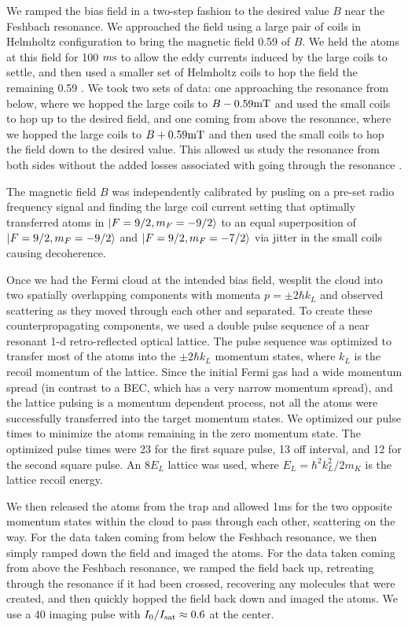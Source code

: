 \documentclass[12pt]{iopart}
\begin{document}
\par We ramped the bias field in a two-step fashion to the desired value $B$ near the Feshbach resonance. We approached the field using a large pair of  coils in Helmholtz configuration to bring the magnetic field 0.59 \mT{} of $B$. We held the atoms at this field for 100 $m\rm{s}$ to allow the eddy currents induced by the large coils to settle, and then used a smaller set of Helmholtz coils to hop the field the remaining 0.59 \mT{}. We took two sets of data: one approaching the resonance from below, where we hopped the large coils to $B-0.59 \mT{}$ and used the small coils to hop up to the desired field, and one coming from above the resonance, where we hopped the large coils to  $B+0.59  \mT{}$ and then used the small coils to hop the field down to the desired value. This allowed us study the resonance from both sides without the added losses associated with going through the resonance \cite{Chin10}.
\par The magnetic field $B$ was independently calibrated by pusling on a pre-set radio frequency signal and finding the large coil current setting that optimally transferred \K{} atoms in $\mathinner{|{F=9/2,m_F=-9/2}\rangle}$ to an equal superposition of $\mathinner{|{F=9/2,m_F=-9/2}\rangle}$ and $\mathinner{|{F=9/2,m_F=-7/2}\rangle}$ via jitter in the small coils causing decoherence.
\par Once we had the Fermi cloud at the intended bias field, wesplit the cloud into two spatially overlapping components with momenta $p=\pm 2\hbar k_L$  and observed scattering as they moved through each other and separated. To create these counterpropagating components, we used a double pulse sequence \cite{Wu05} of a near resonant 1-d retro-reflected optical lattice. The pulse sequence was optimized to transfer most of the atoms into the $\pm 2 \hbar k_L$ momentum states, where $k_L$ is the recoil momentum of the lattice. Since the initial Fermi gas had a wide momentum spread (in contrast to a BEC, which has a very narrow momentum spread), and the lattice pulsing is a momentum dependent process, not all the atoms were successfully transferred into the target momentum states. We optimized our pulse times to minimize the atoms remaining in the zero momentum state. The optimized pulse times were 23 \us{} for the first square pulse, 13 \us{} off interval, and 12 \us{} for the second square pulse. An 8$E_L$ lattice was used, where $E_L=\hbar^2 k_L^2/2m_K$ is the lattice recoil energy.  
\par We then released the atoms from the trap and allowed 1ms for the two opposite momentum states within the cloud to pass through each other, scattering on the way. For the data taken coming from below the Feshbach resonance, we then simply ramped down the field and imaged the atoms. For the data taken coming from above the Feshbach resonance, we ramped the field back up, retreating through the resonance if it had been crossed, recovering any molecules that were created, and then quickly hopped the field back down and imaged the atoms. We use a 40 \us{} imaging pulse with $I_0/I_{\rm{sat}}\approx 0.6$ at the center. 
\end{document}
